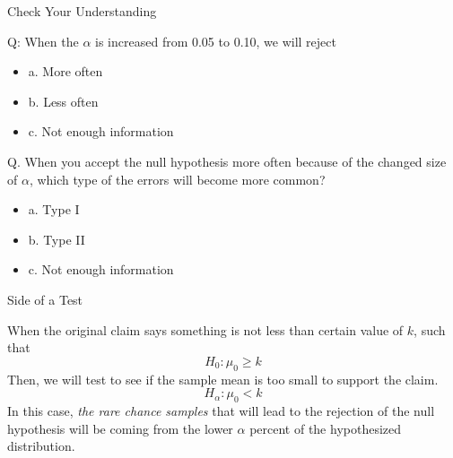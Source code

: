 \documentclass{beamer}
\begin{document}
\begin{frame}{Check Your Understanding}

Q: When the $\alpha$ is increased from 0.05 to 0.10, we will reject 

\begin{itemize}
\item a. More often
\item b. Less often 
\item c. Not enough information 

\end{itemize}

Q. When you accept the null hypothesis more often because of the changed size of $\alpha$, which type of the errors will become more common? 
\begin{itemize}
\item a. Type I
\item b. Type II
\item c. Not enough information
\end{itemize}
\end{frame}



\begin{frame}{Side of a Test}

When the original claim says something is not less than certain value of $k$, such that 
$$H_0: \mu_0 \geq k$$
Then, we will test to see if the sample mean is too small to support the claim. 
$$H_\alpha: \mu_0 < k$$
In this case, \textit{the rare chance samples} that will lead to the rejection of the null hypothesis will be coming from the lower $\alpha$ percent of the hypothesized distribution.


\end{frame}
\end{document}
